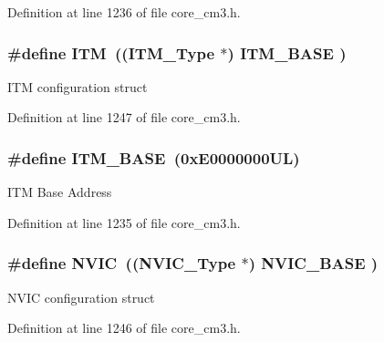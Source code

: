 Definition at line 1236 of file core\+\_\+cm3.\+h.

\subsubsection[{\texorpdfstring{I\+TM}{ITM}}]{\setlength{\rightskip}{0pt plus 5cm}\#define I\+TM~(({\bf I\+T\+M\+\_\+\+Type}       $\ast$)     {\bf I\+T\+M\+\_\+\+B\+A\+SE}      )}\hypertarget{group__CMSIS__core__base_gabae7cdf882def602cb787bb039ff6a43}{}\label{group__CMSIS__core__base_gabae7cdf882def602cb787bb039ff6a43}
I\+TM configuration struct 

Definition at line 1247 of file core\+\_\+cm3.\+h.

\subsubsection[{\texorpdfstring{I\+T\+M\+\_\+\+B\+A\+SE}{ITM_BASE}}]{\setlength{\rightskip}{0pt plus 5cm}\#define I\+T\+M\+\_\+\+B\+A\+SE~(0x\+E0000000\+U\+L)}\hypertarget{group__CMSIS__core__base_gadd76251e412a195ec0a8f47227a8359e}{}\label{group__CMSIS__core__base_gadd76251e412a195ec0a8f47227a8359e}
I\+TM Base Address 

Definition at line 1235 of file core\+\_\+cm3.\+h.

\subsubsection[{\texorpdfstring{N\+V\+IC}{NVIC}}]{\setlength{\rightskip}{0pt plus 5cm}\#define N\+V\+IC~(({\bf N\+V\+I\+C\+\_\+\+Type}      $\ast$)     {\bf N\+V\+I\+C\+\_\+\+B\+A\+SE}     )}\hypertarget{group__CMSIS__core__base_gac8e97e8ce56ae9f57da1363a937f8a17}{}\label{group__CMSIS__core__base_gac8e97e8ce56ae9f57da1363a937f8a17}
N\+V\+IC configuration struct 

Definition at line 1246 of file core\+\_\+cm3.\+h.

